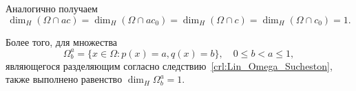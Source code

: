 Аналогично получаем
\begin{equation}
	\dim_H (\Omega \cap ac) = \dim_H (\Omega \cap ac_0) = \dim_H (\Omega \cap c) = \dim_H (\Omega \cap c_0) = 1
	.
\end{equation}

Более того, для множества
\begin{equation}
	\Omega^a_b = \{x\in\Omega : p(x) = a, q(x) = b\}
	,
	\quad 0 \leq b < a \leq 1
	,
\end{equation}
являющегося разделяющим согласно следствию~\ref{crl:Lin_Omega_Sucheston},
также выполнено равенство $\dim_H \Omega^a_b = 1$.
